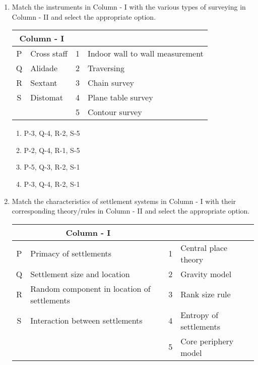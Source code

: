 \documentclass[12pt]{article}
\begin{document}
\begin{enumerate}[label=Q.\arabic*,start=26]	
	\item Match the instruments in Column - I with the various types of surveying in Column - II and select the appropriate option.

		\begin{center}
			\begin{tabular}{|c|>{\raggedright\arraybackslash}p{4cm}|c|>{\raggedright\arraybackslash}p{6cm}|}
				\hline
				\multicolumn{2}{|c|}{\textbf{Column - I}} & \multicolumn{2}{c|}{\textbf{Column - II}} \\
				\hline
				P & Cross staff & 1 & Indoor wall to wall measurement \\
				\hline
				Q & Alidade & 2 & Traversing \\
				\hline
				R & Sextant & 3 & Chain survey \\
				\hline
				S & Distomat & 4 & Plane table survey \\
				\hline
				&           & 5 & Contour survey \\
				\hline
			\end{tabular}
		\end{center}

		\begin{multicols}{2}
			\begin{enumerate}
				\item P-3, Q-4, R-2, S-5
				\item P-2, Q-4, R-1, S-5
				\item P-5, Q-3, R-2, S-1
				\item P-3, Q-4, R-2, S-1
			\end{enumerate}
		\end{multicols}

	\item Match the characteristics of settlement systems in Column - I with their corresponding theory/rules in Column - II and select the appropriate option.

		\begin{center}
			\begin{tabular}{|c|>{\raggedright\arraybackslash}p{4cm}|c|>{\raggedright\arraybackslash}p{6cm}|}
				\hline
				\multicolumn{2}{|c|}{\textbf{Column - I}} & \multicolumn{2}{c|}{\textbf{Column - II}} \\
				\hline
				P & Primacy of settlements & 1 & Central place theory \\
				\hline
				Q & Settlement size and location & 2 & Gravity model \\
				\hline
				R & Random component in location of settlements & 3 & Rank size rule \\
				\hline
				S & Interaction between settlements & 4 & Entropy of settlements \\
				\hline
				&                                 & 5 & Core periphery model \\
				\hline
			\end{tabular}
		\end{center}


\end{enumerate}
\end{document}
